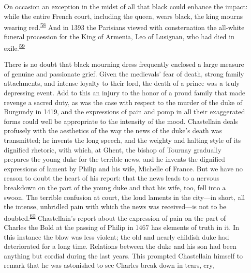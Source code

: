 On occasion an exception in the midst of all that black could enhance
the impact: while the entire French court, including the queen, wears
black, the king mourns wearing
red.\textsuperscript{\protect\hypertarget{09_Chapter_Two__THE_CRAVING_FOR_A_M.xhtmlux5cux23id_1972}{\protect\hyperlink{23_NOTES.xhtmlux5cux23id_1973}{58}}}
And in 1393 the Parisians viewed with consternation the all-white
funeral procession for the King of Armenia, Leo of Lusignan, who had
died in
exile.\textsuperscript{\protect\hypertarget{09_Chapter_Two__THE_CRAVING_FOR_A_M.xhtmlux5cux23id_1970}{\protect\hyperlink{23_NOTES.xhtmlux5cux23id_1971}{59}}}

There is no doubt that black mourning dress frequently enclosed a large
measure of genuine and passionate grief. Given the medievals' fear of
death, strong family attachments, and intense loyalty to their lord, the
death of a prince was a truly depressing event. Add to this an injury to
the honor of a proud family that made revenge a sacred duty, as was the
case with respect to the murder of the duke of Burgundy in 1419, and the
expressions of pain and pomp in all their exaggerated forms could well
be appropriate to the intensity of the mood. Chastellain deals profusely
with the aesthetics of the way the news of the duke's death was
transmitted; he invents the long speech, and the weighty and halting
style of its dignified rhetoric, with which, at Ghent, the bishop of
Tournay gradually prepares the young duke for the terrible news, and he
invents the dignified expressions of lament by Philip and his wife,
Michelle of France. But we have no reason to doubt the heart of his
report: that the news leads to a nervous breakdown on the part of the
young duke and that his wife, too, fell into a swoon. The terrible
confusion at court, the loud laments in the city---in short, all the
intense, unbridled pain with which the news was received---is not to be
doubted.\textsuperscript{\protect\hypertarget{09_Chapter_Two__THE_CRAVING_FOR_A_M.xhtmlux5cux23id_1968}{\protect\hyperlink{23_NOTES.xhtmlux5cux23id_1969}{60}}}
Chastellain's report about the expression of pain on the part of Charles
the Bold at the passing of Philip in 1467 has elements of truth in it.
In this instance the blow was less violent; the old and nearly childish
duke had deteriorated
\protect\hypertarget{09_Chapter_Two__THE_CRAVING_FOR_A_M.xhtmlux5cux23page_55}{}{}for
a long time. Relations between the duke and his son had been anything
but cordial during the last years. This prompted Chastellain himself to
remark that he was astonished to see Charles break down in tears, cry,
